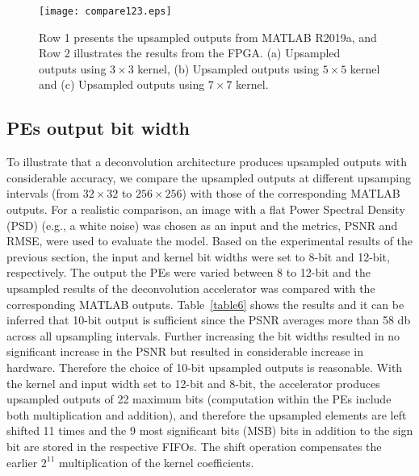 \documentclass[journal]{IEEEtran}
\begin{document}
\begin{figure*}[h]
	\centering
	\texttt{[image: compare123.eps]}
 	\caption{Row 1 presents the upsampled outputs from MATLAB R2019a, and Row 2 illustrates the results from the FPGA. (a) Upsampled outputs  using $3 \times 3$ kernel, (b) Upsampled outputs using $5 \times 5$ kernel and (c) Upsampled outputs using $7 \times 7$ kernel.}
	\label{fig11}
\end{figure*}


\subsection{ PEs output bit width}\label{sec:About PE output data bits}
 To illustrate that a deconvolution architecture produces upsampled outputs with considerable accuracy, we compare the upsampled outputs at different upsamping intervals (from $32\times32$ to $256\times256$) with those of the corresponding MATLAB outputs. For a realistic comparison, an image with a flat Power Spectral Density (PSD) (e.g., a white noise) was chosen as an input and the metrics, PSNR and RMSE, were used to evaluate the model. Based on the experimental results of the previous section, the input and kernel bit widths were set to 8-bit and 12-bit, respectively. The output the PEs were varied between 8 to 12-bit and the upsampled results of the deconvolution accelerator was compared with the corresponding MATLAB outputs. Table~\ref{table6} shows the results and it can be inferred that 10-bit output is sufficient since the PSNR averages more than 58 db across all upsampling intervals. Further increasing the bit widths resulted in no significant increase in the PSNR but resulted in considerable increase in hardware. Therefore the choice of 10-bit upsampled outputs is reasonable.
 With the kernel and input width set to 12-bit and 8-bit, the accelerator produces upsampled outputs of 22 maximum bits (computation within the PEs include both multiplication and addition), and therefore the upsampled elements are left shifted 11 times and the 9 most significant bits (MSB) bits in addition to the sign bit are stored in the respective FIFOs. The shift operation compensates the earlier $2^{11}$ multiplication of the kernel coefficients.
\end{document}
